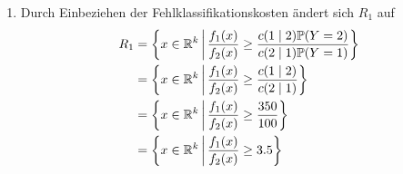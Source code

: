 \documentclass{article}
\begin{document}
\begin{enumerate}[label=(\alph*)]
		\item Durch Einbeziehen der Fehlklassifikationskosten ändert sich $R_1$ auf
		\begin{align}
			R_1 &= \left\lbrace x\in \mathbb{R}^k\,\bigg\vert\, \frac{f_1(x)}{f_2(x)} \ge \frac{c(1\mid 2)\mathbb{P}(Y=2)}{c(2\mid 1)\mathbb{P}(Y=1)}\right\rbrace \notag \\
			&= \left\lbrace x\in \mathbb{R}^k\,\bigg\vert\, \frac{f_1(x)}{f_2(x)} \ge \frac{c(1\mid 2)}{c(2\mid 1)}\right\rbrace \notag \\
			&= \left\lbrace x\in \mathbb{R}^k\,\bigg\vert\, \frac{f_1(x)}{f_2(x)} \ge \frac{350}{100}\right\rbrace \notag \\
			&= \left\lbrace x\in \mathbb{R}^k\,\bigg\vert\, \frac{f_1(x)}{f_2(x)} \ge 3.5\right\rbrace \notag
		\end{align}
	\end{enumerate}
	
\end{document}
